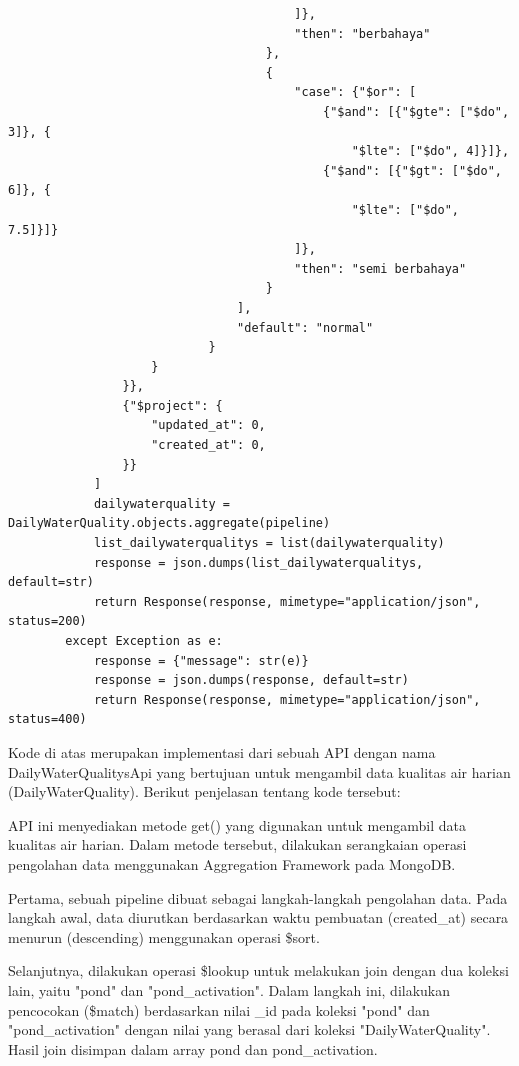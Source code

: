\begin{enumerate}[1.]
\begin{lstlisting}
                                        ]},
                                        "then": "berbahaya"
                                    },
                                    {
                                        "case": {"$or": [
                                            {"$and": [{"$gte": ["$do", 3]}, {
                                                "$lte": ["$do", 4]}]},
                                            {"$and": [{"$gt": ["$do", 6]}, {
                                                "$lte": ["$do", 7.5]}]}
                                        ]},
                                        "then": "semi berbahaya"
                                    }
                                ],
                                "default": "normal"
                            }
                    }
                }},
                {"$project": {
                    "updated_at": 0,
                    "created_at": 0,
                }}
            ]
            dailywaterquality = DailyWaterQuality.objects.aggregate(pipeline)
            list_dailywaterqualitys = list(dailywaterquality)
            response = json.dumps(list_dailywaterqualitys, default=str)
            return Response(response, mimetype="application/json", status=200)
        except Exception as e:
            response = {"message": str(e)}
            response = json.dumps(response, default=str)
            return Response(response, mimetype="application/json", status=400)
\end{lstlisting}


Kode di atas merupakan implementasi dari sebuah API dengan nama DailyWaterQualitysApi yang bertujuan untuk mengambil data kualitas air harian (DailyWaterQuality). Berikut penjelasan tentang kode tersebut:

API ini menyediakan metode get() yang digunakan untuk mengambil data kualitas air harian. Dalam metode tersebut, dilakukan serangkaian operasi pengolahan data menggunakan Aggregation Framework pada MongoDB.

Pertama, sebuah pipeline dibuat sebagai langkah-langkah pengolahan data. Pada langkah awal, data diurutkan berdasarkan waktu pembuatan (created\_at) secara menurun (descending) menggunakan operasi \$sort.

Selanjutnya, dilakukan operasi \$lookup untuk melakukan join dengan dua koleksi lain, yaitu "pond" dan "pond\_activation". Dalam langkah ini, dilakukan pencocokan (\$match) berdasarkan nilai \_id pada koleksi "pond" dan "pond\_activation" dengan nilai yang berasal dari koleksi "DailyWaterQuality". Hasil join disimpan dalam array pond dan pond\_activation.


\end{enumerate}
